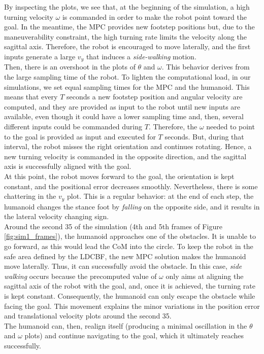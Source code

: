 By inspecting the plots, we see that, at the beginning of the simulation, a high turning velocity $\omega$ is commanded in order to make the robot point toward the goal. In the meantime, the MPC provides new footstep positions but, due to the maneuverability constraint, the high turning rate limits the velocity along the sagittal axis. Therefore, the robot is encouraged to move laterally, and the first inputs generate a large $v_y$ that induces a \textit{side-walking} motion.\\
Then, there is an overshoot in the plots of $\theta$ and $\omega$. This behavior derives from the large sampling time of the robot. To lighten the computational load, in our simulations, we set equal sampling times for the MPC and the humanoid. This means that every $T$ seconds a new footstep position and angular velocity are computed, and they are provided as input to the robot until new inputs are available, even though it could have a lower sampling time and, then, several different inputs could be commanded during $T$. Therefore, the $\omega$ needed to point to the goal is provided as input and executed for $T$ seconds. But, during that interval, the robot misses the right orientation and continues rotating. Hence, a new turning velocity is commanded in the opposite direction, and the sagittal axis is successfully aligned with the goal.\\
At this point, the robot moves forward to the goal, the orientation is kept constant, and the positional error decreases smoothly. Nevertheless, there is some chattering in the $v_y$ plot. This is a regular behavior: at the end of each step, the humanoid changes the stance foot by \textit{falling} on the opposite side, and it results in the lateral velocity changing sign.\\
Around the second 35 of the simulation (4th and 5th frames of Figure \ref{fig:sim1_frames}), the humanoid approaches one of the obstacles. It is unable to go forward, as this would lead the CoM into the circle. To keep the robot in the safe area defined by the LDCBF, the new MPC solution makes the humanoid move laterally. Thus, it can successfully avoid the obstacle. In this case, \textit{side walking} occurs because the precomputed value of $\omega$ only aims at aligning the sagittal axis of the robot with the goal, and, once it is achieved, the turning rate is kept constant. Consequently, the humanoid can only escape the obstacle while facing the goal. This movement explains the minor variations in the position error and translational velocity plots around the second 35.\\
The humanoid can, then, realign itself (producing a minimal oscillation in the $\theta$ and $\omega$ plots) and continue navigating to the goal, which it ultimately reaches successfully.

